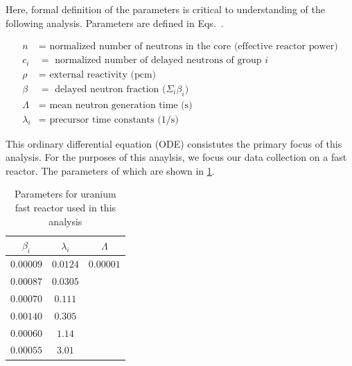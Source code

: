 \documentclass[review,onefignum,onetabnum]{siamart171218}
\begin{document}
Here, formal definition of the parameters is critical to understanding of the
following analysis. Parameters are defined in Eqs.~.

\begin{align}
  \label{eq:param_1}
  n &= \text{ normalized number of neutrons in the core (effective reactor power)} \\
  \label{eq:param_2}
  c_i &= \text{ normalized number of delayed neutrons of group $i$} \\
  \label{eq:param_3}
  \rho &= \text{ external reactivity (pcm) } \\
  \label{eq:param_4}
  \beta &= \text{ delayed neutron fraction ($\Sigma_i \beta_i$) } \\
  \label{eq:param_5}
  \Lambda &= \text{ mean neutron generation time (s)} \\
  \label{eq:param_6}
  \lambda_i &= \text{ precursor time constants (1/s)}
\end{align}

This ordinary differential equation (ODE) consistutes the primary focus of this
analysis. \cite{Dynamics}
For the purposes of this anaylsis, we focus our data collection on a 
fast reactor. The parameters of which are shown in \cref{tab:reactor_params}.
\begin{table}
  \begin{center}
    \begin{tabular}{c|c|c}
      $\beta_i$&$\lambda_i$&$\Lambda$\\
      \hline
      $0.00009$&$0.0124$&$0.00001$\\
      $0.00087$&$0.0305$&\\
      $0.00070$&$0.111$&\\
      $0.00140$&$0.305$&\\
      $0.00060$&$1.14$&\\
      $0.00055$&$3.01$&\\
    \end{tabular}
    \caption{Parameters for uranium fast reactor used in this analysis}
    \label{tab:reactor_params}
  \end{center}
\end{table}
\end{document}
